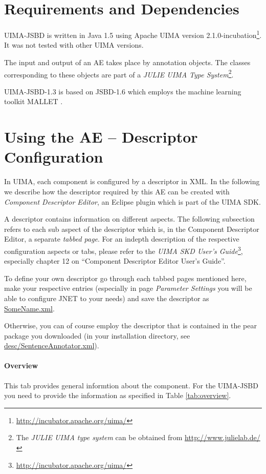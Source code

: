 \documentclass[11pt,a4paper,halfparskip]{scrartcl}
\begin{document}
\section{Requirements and Dependencies}

UIMA-JSBD is written in Java 1.5 using Apache UIMA version
2.1.0-incubation\footnote{\url{http://incubator.apache.org/uima/}}. It
was not tested with other UIMA versions.

The input and output of an AE takes place by annotation objects. The
classes corresponding to these objects are part of a \emph{JULIE UIMA
  Type System}\footnote{The \emph{JULIE UIMA type system} can be
  obtained from \url{http://www.julielab.de/}}.

UIMA-JSBD-1.3 is based on JSBD-1.6 which employs the machine learning
toolkit MALLET \cite{mallet}.




\section{Using the AE -- Descriptor Configuration}

In UIMA, each component is configured by a descriptor in XML. In the
following we describe how the descriptor required by this AE can be
created with \emph{Component Descriptor Editor}, an Eclipse plugin
which is part of the UIMA SDK.

A descriptor contains information on different aspects. The following
subsection refers to each sub aspect of the descriptor which is, in
the Component Descriptor Editor, a separate \emph{tabbed page}. For an
indepth description of the respective configuration aspects or tabs,
please refer to the \emph{UIMA SKD User's
  Guide}\footnote{\url{http://incubator.apache.org/uima/}}, especially
chapter 12 on ``Component Descriptor Editor User's Guide''.

To define your own descriptor go through each tabbed pages mentioned
here, make your respective entries (especially in page \emph{Parameter
  Settings} you will be able to configure JNET to your needs) and save
the descriptor as \url{SomeName.xml}.

Otherwise, you can of course employ the descriptor that is contained
in the pear package you downloaded (in your installation directory, see
\url{desc/SentenceAnnotator.xml}).

\paragraph{Overview}
This tab provides general informtion about the component. For the
UIMA-JSBD you need to provide the information as specified in Table
\ref{tab:overview}.
\end{document}
